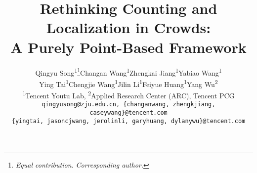 \documentclass[10pt,twocolumn,letterpaper]{article}
\begin{document}
\title{Rethinking Counting and Localization in Crowds: \\A Purely Point-Based Framework}
\author{Qingyu Song\textsuperscript{\rm 1}\thanks{\textit{Equal contribution.} \textit{Corresponding author.}}\hspace{1em}Changan Wang\textsuperscript{\rm 1}\hspace{1em}Zhengkai Jiang\textsuperscript{\rm 1}\hspace{1em}Yabiao Wang\textsuperscript{\rm 1}\\Ying Tai\textsuperscript{\rm 1}\hspace{1em}Chengjie Wang\textsuperscript{\rm 1}\hspace{1em}Jilin Li\textsuperscript{\rm 1}\hspace{1em}Feiyue Huang\textsuperscript{\rm 1}\hspace{1em}Yang Wu\textsuperscript{\rm 2}\hspace{1em}\\
\textsuperscript{\rm 1}Tencent Youtu Lab, \textsuperscript{\rm 2}Applied Research Center (ARC), Tencent PCG\\
{\tt\small qingyusong@zju.edu.cn, \{changanwang, zhengkjiang, caseywang\}@tencent.com}\\{\tt\small \{yingtai, jasoncjwang, jerolinli, garyhuang, dylanywu\}@tencent.com}
}

\maketitle
\ificcvfinal\thispagestyle{empty}\fi
\end{document}
